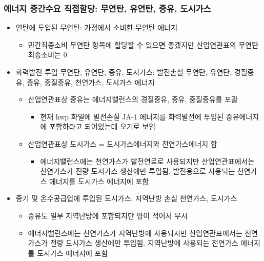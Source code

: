 \documentclass[10pt,compress,slidetop,%
			   hyperref={unicode},xcolor={svgnames},%
			   t]{beamer}
\begin{document}
\begin{frame}
	\frametitle{에너지 중간수요 직접할당: 무연탄, 유연탄, 중유, 도시가스}
\begin{itemize}
\item {연탄에 투입된 무연탄: 가정에서 소비한 무연탄 에너지}
 \begin{itemize}
 \item{민간최종소비 무연탄 항목에 할당할 수 있으면 좋겠지만 산업연관표의 무연탄 최종소비는 0}
 \end{itemize}

\item{화력발전 투입 무연탄, 유연탄, 중유, 도시가스: 발전손실 무연탄, 유연탄, 경질중유, 중유, 중질중유, 천연가스, 도시가스 에너지}
 \begin{itemize}
 \item{산업연관표상 중유는 에너지밸런스의 경질중유, 중유, 중질중유를 포괄}
   \begin{itemize}
   \item{현재 hwp 화일에 발전손실 JA-1 에너지를 화력발전에 투입된 중유에너지에 포함하라고 되어있는데 오기로 보임}
   \end{itemize}
 \item{산업연관표상 도시가스 = 도시가스에너지와 천연가스에너지 합}
   \begin{itemize}
   \item{에너지밸런스에는 천연가스가 발전연료로 사용되지만 산업연관표에서는 천연가스가 전량 도시가스 생산에만 투입됨. 발전용으로 사용되는 천연가스 에너지를 도시가스 에너지에 포함}
   \end{itemize}
 \end{itemize}
\item{증기 및 온수공급업에 투입된 도시가스: 지역난방 손실 천연가스, 도시가스}
  \begin{itemize}
  \item{중유도 일부 지역난방에 포함되지만 양이 적어서 무시}
  \item{에너지밸런스에는 천연가스가 지역난방에 사용되지만 산업연관표에서는 천연가스가 전량 도시가스 생산에만 투입됨. 지역난방에 사용되는  천연가스 에너지를 도시가스 에너지에 포함}
  \end{itemize}
\end{itemize}	
	
\end{frame}
\end{document}
